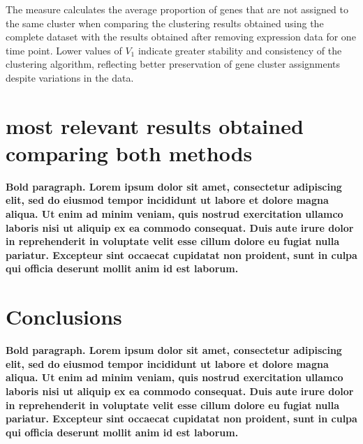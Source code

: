 \documentclass{llncs}
\begin{document}
The measure calculates the average proportion of genes that are not assigned to the same cluster when comparing the clustering results obtained using the complete dataset with the results obtained after removing expression data for one time point. Lower values of $V_1$ indicate greater stability and consistency of the clustering algorithm, reflecting better preservation of gene cluster assignments despite variations in the data.\cite{datta2003}


\section{most relevant results obtained comparing both methods}

\textbf{Bold paragraph. Lorem ipsum dolor sit amet, consectetur adipiscing elit, sed do eiusmod tempor incididunt ut labore et dolore magna aliqua. Ut enim ad minim veniam, quis nostrud exercitation ullamco laboris nisi ut aliquip ex ea commodo consequat. Duis aute irure dolor in reprehenderit in voluptate velit esse cillum dolore eu fugiat nulla pariatur. Excepteur sint occaecat cupidatat non proident, sunt in culpa qui officia deserunt mollit anim id est laborum.}
 
 
 \section{Conclusions}
 
 \textbf{Bold paragraph. Lorem ipsum dolor sit amet, consectetur adipiscing elit, sed do eiusmod tempor incididunt ut labore et dolore magna aliqua. Ut enim ad minim veniam, quis nostrud exercitation ullamco laboris nisi ut aliquip ex ea commodo consequat. Duis aute irure dolor in reprehenderit in voluptate velit esse cillum dolore eu fugiat nulla pariatur. Excepteur sint occaecat cupidatat non proident, sunt in culpa qui officia deserunt mollit anim id est laborum.}

\end{document}
